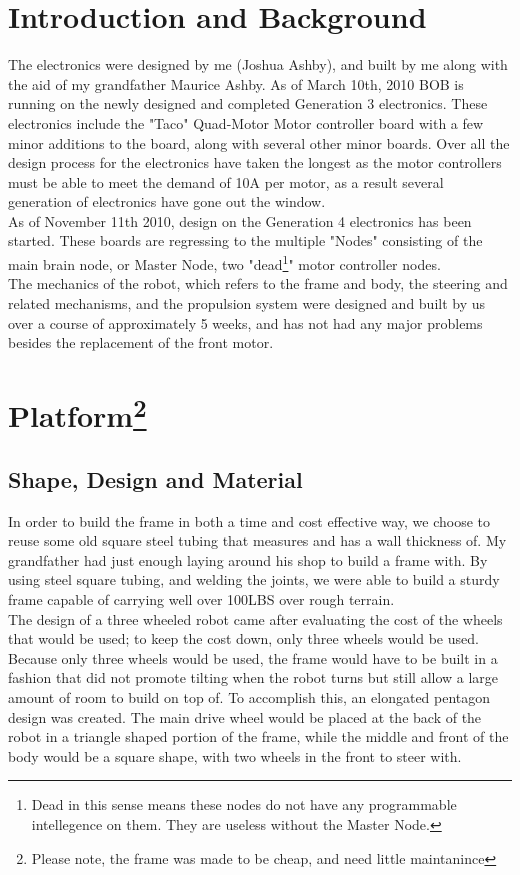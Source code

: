 \documentclass{article}
\begin{document}
\section{Introduction and Background}
The electronics were designed by me (Joshua Ashby), and built by me along with the aid of my grandfather Maurice Ashby. As of March 10th, 2010 BOB is running on the newly designed and completed Generation 3 electronics. These electronics include the "Taco" Quad-Motor Motor controller board with a few minor additions to the board, along with several other minor boards. Over all the design process for the electronics have taken the longest as the motor controllers must be able to meet the demand of 10A per motor, as a result several generation of electronics have gone out the window.\\
As of November 11th 2010, design on the Generation 4 electronics has been started. These boards are regressing to the multiple "Nodes" consisting of the main brain node, or Master Node, two "dead\footnote{Dead in this sense means these nodes do not have any programmable intellegence on them. They are useless without the Master Node.}" motor controller nodes.\\
The mechanics of the robot, which refers to the frame and body, the steering and related mechanisms, and the propulsion system were designed and built by us over a course of approximately 5 weeks, and has not had any major problems besides the replacement of the front motor.\\
\section{Platform\footnote{Please note, the frame was made to be cheap, and need little maintanince}%
}
\subsection{Shape, Design and Material}
In order to build the frame in both a time and cost effective way, we choose to reuse some old square steel tubing that measures  and has a wall thickness of. My grandfather had just enough laying around his shop to build a frame with. By using steel square tubing, and welding the joints, we were able to build a sturdy frame capable of carrying well over 100LBS over rough terrain.\\
The design of a three wheeled robot came after evaluating the cost of the wheels that would be used; to keep the cost down, only three wheels would be used. Because only three wheels would be used, the frame would have to be built in a fashion that did not promote tilting when the robot turns but still allow a large amount of room to build on top of. To accomplish this, an elongated pentagon design was created. The main drive wheel would be placed at the back of the robot in a triangle shaped portion of the frame, while the middle and front of the body would be a square shape, with two wheels in the front to steer with.\\
\end{document}

